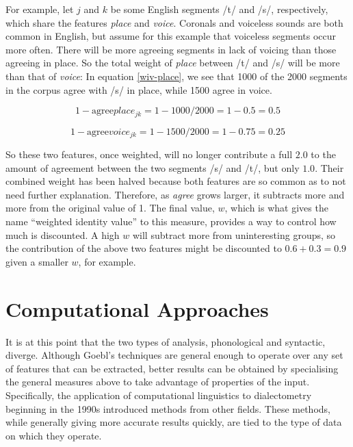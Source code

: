 \documentclass[11pt]{article}
\begin{document}
For example, let $j$ and $k$ be some English segments /t/ and /s/,
respectively, which share the features \textit{place} and
\textit{voice}. Coronals
and voiceless sounds are both common in English, but assume for this
example that voiceless segments occur more often. There will be more
agreeing segments in lack of voicing than those agreeing in place. So the
total weight of \textit{place} between /t/ and /s/ will be more than
that of \textit{voice}: In equation \ref{wiv-place}, we see that 1000
of the 2000 segments in the corpus agree with /s/ in place, while 1500
agree in voice.

\begin{equation}
  1 - \textrm{agree}place_{jk} = 1 - 1000/2000 = 1 - 0.5 = 0.5
  \label{wiv-place}
  \end{equation}

\begin{equation}
  1 - \textrm{agree}voice_{jk} = 1 - 1500/2000 = 1 - 0.75 = 0.25
  \label{wiv-voice}
\end{equation}

So these two features, once weighted, will no longer contribute a full
$2.0$ to the amount of agreement between the two segments /s/ and /t/,
but only $1.0$. Their combined weight has been halved because both
features are so common as to not need further explanation.
Therefore, as \textit{agree} grows larger, it subtracts more and more
from the original value of 1.
The final value, $w$, which is what gives the name ``weighted identity
value'' to this measure, provides a way to control how much is
discounted. A high $w$ will subtract more from uninteresting groups,
so the contribution of the above two features might be discounted to
$0.6 + 0.3 = 0.9$ given a smaller $w$, for example.


\section{Computational Approaches}

It is at this point that the two types of analysis, phonological and
syntactic, diverge. Although Goebl's techniques are general enough to
operate over any set of features that can be extracted, better results
can be obtained by specialising the general measures above to take
advantage of properties of the input.  Specifically, the application
of computational linguistics to dialectometry beginning in the 1990s
introduced methods from other fields. These methods, while generally
giving more accurate results quickly, are tied to the type of data on
which they operate.
\end{document}
